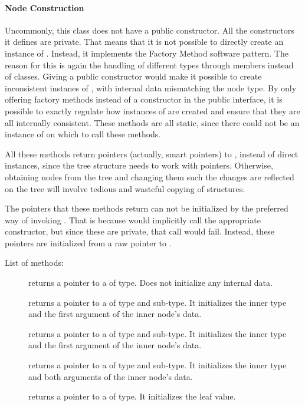 \documentclass{article}
\begin{document}
\paragraph{Node Construction}

Uncommonly, this class does not have a public constructor. All the constructors it defines are private. That means that it is not possible to directly create an instance of \cnode. Instead, it implements the Factory Method software pattern. The reason for this is again the handling of different types through members instead of classes. Giving a public constructor would make it possible to create inconsistent instanes of \cnode, with internal data mismatching the node type. By only offering factory methods instead of a constructor in the public interface, it is possible to exactly regulate how instances of \cnode are created and ensure that they are all internally consistent. These methods are all static, since there could not be an instance of \cnode on which to call these methods. 

All these methods return pointers (actually, smart pointers) to \cnode, instead of direct instances, since the tree structure needs to work with pointers. Otherwise, obtaining nodes from the tree and changing them such the changes are reflected on the tree will involve tedious and wasteful copying of structures. 

The  pointers that these methods return can not be initialized by the preferred way of invoking . That is because  would implicitly call the appropriate constructor, but since these are private, that call would fail. Instead, these pointers are initialized from a raw pointer to \cnode.

List of methods:

\begin{description}
\item[] returns a pointer to a \cnode of  type. Does not initialize any internal data.
\item[] returns a pointer to a \cnode of  type and  sub-type. It initializes the inner type and the first argument of the inner node's data.
\item[] returns a pointer to a \cnode of  type and  sub-type. It initializes the inner type and the first argument of the inner node's data. 
\item[] returns a pointer to a \cnode of  type and  sub-type. It initializes the inner type and both arguments of the inner node's data.
\item[] returns a pointer to a \cnode of  type. It initializes the leaf value.
\end{description}
\end{document}
